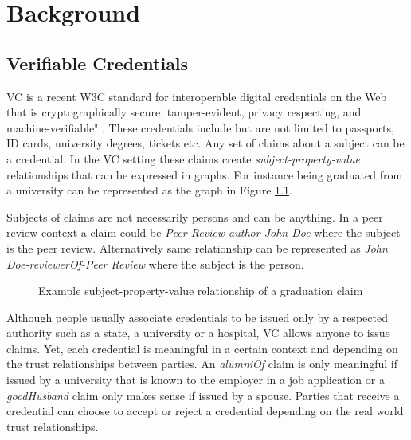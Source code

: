 
\chapter{Background}\label{chapter:background}

\section{Verifiable Credentials}

\acrfull{VC} is a recent \acrshort{W3C} standard for interoperable digital credentials on the Web that is cryptographically secure, tamper-evident, privacy respecting, and machine-verifiable" \parencite{Sporny.18Kas2019}. These credentials include but are not limited to passports, ID cards, university degrees, tickets etc. Any set of claims about a subject can be a credential. In the \acrshort{VC} setting these claims create \textit{subject-property-value} relationships that can be expressed in graphs. For instance being graduated from a university can be represented as the graph in Figure \ref{fig:alumniOf}. 

Subjects of claims are not necessarily persons and can be anything. In a peer review context a claim could be \textit{Peer Review-author-John Doe} where the subject is the peer review. Alternatively same relationship can be represented as \textit{John Doe-reviewerOf-Peer Review} where the subject is the person.

\begin{figure}[htbp]
  \centering
  
  \caption{Example subject-property-value relationship of a graduation claim \parencite{Sporny.18Kas2019}} \label{fig:alumniOf}
\end{figure}

Although people usually associate credentials to be issued only by a respected authority such as a state, a university or a hospital, \acrlong{VC} allows anyone to issue claims. Yet, each credential is meaningful in a certain context and depending on the trust relationships between parties. An \textit{alumniOf} claim is only meaningful if issued by a university that is known to the employer in a job application or a \textit{goodHusband} claim only makes sense if issued by a spouse. Parties that receive a credential can choose to accept or reject a credential depending on the real world trust relationships.


